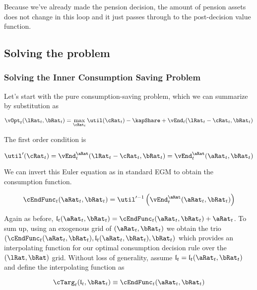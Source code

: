 \documentclass[\econtexRoot/HAFiscal]{subfiles}
\begin{document}
Because we've already made the pension decision, the amount of pension assets
does not change in this loop and it just passes through to the post-decision
value function.

\subsection{Solving the problem}

\subsubsection{Solving the Inner Consumption Saving Problem}

Let's start with the pure consumption-saving problem, which we can summarize by
substitution as

\begin{equation}
    \vOpt_{t}(\lRat_{t}, \bRat_{t}) = \max_{\cRat_{t}} \util(\cRat_{t}) - \kapShare +
    \vEnd_{t}(\lRat_{t} - \cRat_{t}, \bRat_{t})
\end{equation}

The first order condition is

\begin{equation}
    \util'(\cRat_{t}) = \vEnd_{t}^{\aRat}(\lRat_{t}-\cRat_{t}, \bRat_{t}) =
    \vEnd_{t}^{\aRat}(\aRat_{t}, \bRat_{t})
\end{equation}

We can invert this Euler equation as in standard EGM to obtain the consumption
function.

\begin{equation}
    \cEndFunc_{t}(\aRat_{t}, \bRat_{t}) =
    \util'^{-1}\left(\vEnd_{t}^{\aRat}(\aRat_{t}, \bRat_{t})\right)
\end{equation}

\providecommand{\lEndFunc}{\ensuremath{\mathfrak{l}}}

Again as before, $\lEndFunc_{t}(\aRat_{t}, \bRat_{t}) =
    \cEndFunc_{t}(\aRat_{t}, \bRat_{t}) + \aRat_{t}$. To sum up, using an
exogenous
grid of $(\aRat_{t}, \bRat_{t})$ we obtain the trio $(\cEndFunc_{t}(\aRat_{t},
    \bRat_{t}), \lEndFunc_{t}(\aRat_{t},
    \bRat_{t}), \bRat_{t})$ which
provides an
interpolating function for our optimal consumption decision rule over the
$(\lRat, \bRat)$ grid. Without loss of generality, assume $\lEndFunc_{t} =
    \lEndFunc_{t}(\aRat_{t}, \bRat_{t})$ and define the interpolating
function as

\begin{equation}
    \cTarg_{t}(\lEndFunc_{t}, \bRat_{t}) \equiv \cEndFunc_{t}(\aRat_{t},
    \bRat_{t})
\end{equation}
\end{document}
